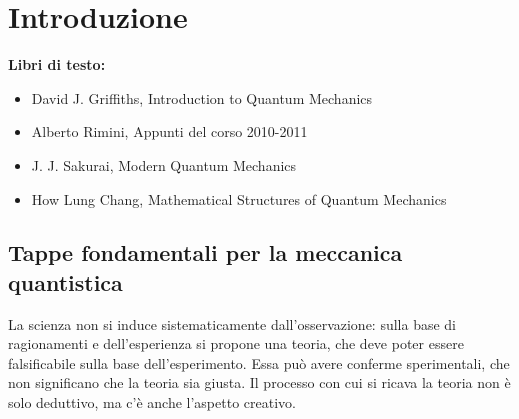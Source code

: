 


%

\chapter{Introduzione} %
\textbf{Libri di testo:} 
\begin{itemize}
\item David J. Griffiths, Introduction to Quantum Mechanics
\item Alberto Rimini, Appunti del corso 2010-2011
\item J. J. Sakurai, Modern Quantum Mechanics
\item How Lung Chang, Mathematical Structures of Quantum Mechanics
\end{itemize}

\section[Tappe fondamentali]{Tappe fondamentali per la meccanica quantistica} %
\label{sec:tappe_fondamentali} 

La scienza non si induce sistematicamente dall'osservazione: sulla
base di ragionamenti e dell'esperienza si propone una teoria, che
deve poter essere falsificabile sulla base dell'esperimento. Essa
può avere conferme sperimentali, che non significano che la teoria
sia giusta. Il processo con cui si ricava la teoria non è solo deduttivo,
ma c'è anche l'aspetto creativo.

